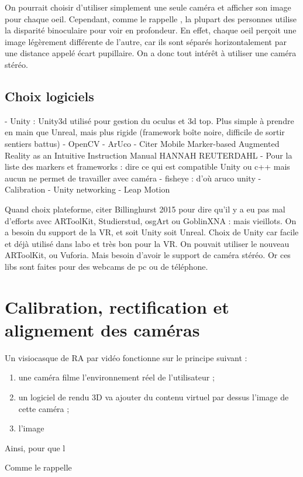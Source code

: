 On pourrait choisir d'utiliser simplement une seule caméra et afficher son image pour chaque oeil. Cependant, comme le rappelle \citep{Bourke1999}, la plupart des personnes utilise la disparité binoculaire pour voir en profondeur. En effet, chaque oeil perçoit une image légèrement différente de l'autre, car ils sont séparés horizontalement par une distance appelé écart pupillaire. On a donc tout intérêt à utiliser une caméra stéréo.

\subsection{Choix logiciels}
- Unity : Unity3d utilisé pour gestion du oculus et 3d top. Plus simple à prendre en main que Unreal, mais plus rigide (framework boîte noire, difficile de sortir sentiers battus)
- OpenCV
  - ArUco
    - Citer Mobile Marker-based Augmented Reality as an Intuitive Instruction Manual HANNAH REUTERDAHL
    - Pour la liste des markers et frameworks : dire ce qui est compatible Unity ou c++ mais aucun ne permet de travailler avec caméra - fisheye : d'où aruco unity
  - Calibration
- Unity networking
- Leap Motion

Quand choix plateforme, citer Billinghurst 2015 pour dire qu'il y a eu pas mal d'efforts avec ARToolKit, Studierstud, osgArt ou GoblinXNA : mais vieillots. On a besoin du support de la VR, et soit Unity soit Unreal. Choix de Unity car facile et déjà utilisé dans labo et très bon pour la VR.
On pouvait utiliser le nouveau ARToolKit, ou Vuforia. Mais besoin d'avoir le support de caméra stéréo. Or ces libs sont faites pour des webcams de pc ou de téléphone.


\section{Calibration, rectification et alignement des caméras}
Un visiocasque de RA par vidéo fonctionne sur le principe suivant :
\begin{enumerate}
  \item une caméra filme l'environnement réel de l'utilisateur ;
  \item un logiciel de rendu 3D va ajouter du contenu virtuel par dessus l'image de cette caméra ;
  \item l'image
\end{enumerate}

Ainsi, pour que l

Comme le rappelle \cite[p. ]{Billinghurst2015}


